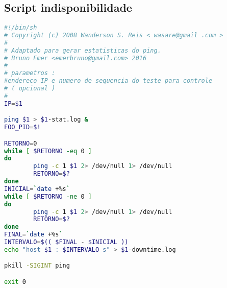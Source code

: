 
\chapter{}
\label{cap:apscripts}

\section{Script indisponibilidade}
\label{ap:scriptindisp}

\begin{lstlisting}[language=bash]
#!/bin/sh
# Copyright (c) 2008 Wanderson S. Reis < wasare@gmail .com >
#
# Adaptado para gerar estatisticas do ping.
# Bruno Emer <emerbruno@gmail.com> 2016
#
# parametros :
#endereco IP e numero de sequencia do teste para controle
# ( opcional )
#
IP=$1

ping $1 > $1-stat.log &
FOO_PID=$!

RETORNO=0
while [ $RETORNO -eq 0 ]
do
        ping -c 1 $1 2> /dev/null 1> /dev/null
        RETORNO=$?
done
INICIAL=`date +%s`
while [ $RETORNO -ne 0 ]
do
        ping -c 1 $1 2> /dev/null 1> /dev/null
        RETORNO=$?
done
FINAL=`date +%s`
INTERVALO=$(( $FINAL - $INICIAL ))
echo "host $1 : $INTERVALO s" > $1-downtime.log

pkill -SIGINT ping

exit 0

\end{lstlisting}
